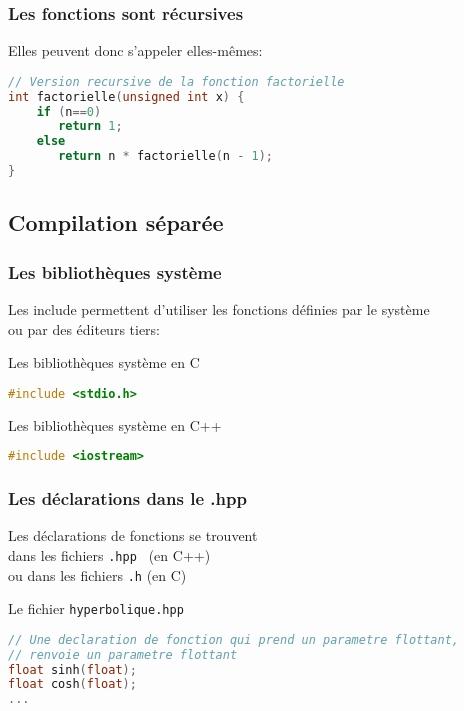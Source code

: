 \documentclass{beamer}
\begin{document}
\begin{frame}[fragile=singleslide,shrink=20]
\frametitle{Les fonctions sont récursives}
Elles peuvent donc s'appeler elles-mêmes:
\begin{lstlisting}[language=c++]
// Version recursive de la fonction factorielle
int factorielle(unsigned int x) {
    if (n==0) 
       return 1;
    else
       return n * factorielle(n - 1);
}
\end{lstlisting}
\end{frame}

\subsection{Compilation séparée}

\begin{frame}[fragile=singleslide,shrink=20]
\frametitle{Les bibliothèques système}
Les include permettent d'utiliser les fonctions définies par le système \\
ou par des éditeurs tiers:

\begin{block}{Les bibliothèques système en C}
\begin{lstlisting}[language=c++]
#include <stdio.h>
\end{lstlisting}
\end{block}

\begin{block}{Les bibliothèques système en C++}
\begin{lstlisting}[language=c++]
#include <iostream>
\end{lstlisting}
\end{block}


\end{frame}

\begin{frame}[fragile=singleslide,shrink=20]
\frametitle{Les déclarations dans le .hpp}
Les déclarations de fonctions se trouvent  \\
dans les fichiers \texttt{.hpp } (en C++) \\
ou dans les fichiers \texttt{.h} (en C)

\begin{block}{Le fichier \texttt{hyperbolique.hpp}}
\begin{lstlisting}[language=c++]
// Une declaration de fonction qui prend un parametre flottant,
// renvoie un parametre flottant
float sinh(float);
float cosh(float);
...
\end{lstlisting}
\end{block}
\end{frame}
\end{document}
